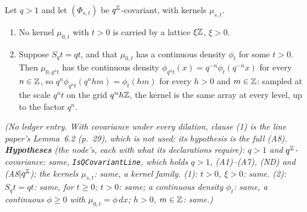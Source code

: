 \begin{proposition}
\label{prop:no-lattice-kernel-line}
\leanok
{}
Let $q > 1$ and let $(\Phi_{s,t})$ be $q^{\mathbb{Z}}$-covariant, with kernels $\mu_{s,t}$.
\begin{enumerate}
\item No kernel $\mu_{0,t}$ with $t > 0$ is carried by a lattice $\xi\mathbb{Z}$, $\xi > 0$.
\item Suppose $S_qt = qt$, and that $\mu_{0,t}$ has a continuous density $\phi_t$ for some
$t > 0$. Then $\mu_{0,q^nt}$ has the continuous density $\phi_{q^nt}(x) = q^{-n}\phi_t(q^{-n}x)$
for every $n \in \mathbb{Z}$, so $q^n\phi_{q^nt}(q^nhm) = \phi_t(hm)$ for every $h > 0$ and $m \in \mathbb{Z}$:
sampled at the scale $q^nt$ on the grid $q^nh\mathbb{Z}$, the kernel is the same array at every level,
up to the factor $q^n$.
\end{enumerate}
\statusT\quad\emph{(No ledger entry. With covariance under every dilation, clause (1) is the line
paper's Lemma~6.2 (p.~29), which is not used: its hypothesis is the full (A8).
\textbf{Hypotheses} (the node's, each with what its declarations require): $q > 1$ and
$q^{\mathbb{Z}}$-covariance: same, \texttt{IsQCovariantLine}, which holds $q > 1$, (A1)--(A7), (ND) and
(A8$|q^{\mathbb{Z}}$); the kernels $\mu_{s,t}$: same, a kernel family. (1): $t > 0$, $\xi > 0$: same.
(2): $S_qt = qt$: same, for $t \ge 0$; $t > 0$: same; a continuous density $\phi_t$: same, a
continuous $\phi \ge 0$ with $\mu_{0,t} = \phi\,dx$; $h > 0$, $m \in \mathbb{Z}$: same.)}
\end{proposition}

